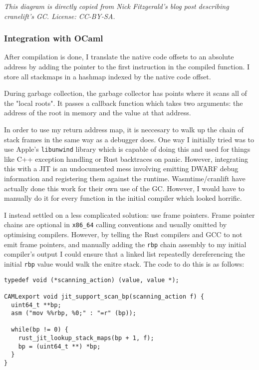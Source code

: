 \emph{This diagram is directly copied from Nick Fitzgerald's blog post \cite{refblog} describing
      cranelift's GC. License: CC-BY-SA.}

\subsubsection{Integration with OCaml}

After compilation is done, I translate the native code offsets to an absolute address by adding the
pointer to the first instruction in the compiled function. I store all stackmaps in a hashmap
indexed by the native code offset.

During garbage collection, the garbage collector has points where it scans all of the "local
roots". It passes a callback function which takes two arguments: the address of the root in memory
and the value at that address.

In order to use my return address map, it is neccesary to walk up the chain of stack frames in the
same way as a debugger does.  One way I initially tried was to use Apple's \texttt{libunwind}
library which is capable of doing this and used for things like C++ exception handling or Rust
backtraces on panic. However, integrating this with a JIT is an undocumented mess involving
emitting DWARF debug information and registering them against the runtime. Wasmtime/cranlift have
actually done this work for their own use of the GC. However, I would have to manually do it for
every function in the initial compiler which looked horrific.

I instead settled on a less complicated solution: use frame pointers. Frame pointer chains are
optional in \texttt{x86\_64} calling conventions and usually omitted by optimising compilers.
However, by telling the Rust compilers and GCC to not emit frame pointers, and manually adding the
\texttt{rbp} chain assembly to my initial compiler's output I could ensure that a linked list
repeatedly dereferencing the initial \texttt{rbp} value would walk the enitre stack. The code to do
this is as follows:

\begin{verbatim}
typedef void (*scanning_action) (value, value *);

CAMLexport void jit_support_scan_bp(scanning_action f) {
  uint64_t **bp;
  asm ("mov %%rbp, %0;" : "=r" (bp));

  while(bp != 0) {
    rust_jit_lookup_stack_maps(bp + 1, f);
    bp = (uint64_t **) *bp;
  }
}
\end{verbatim}

